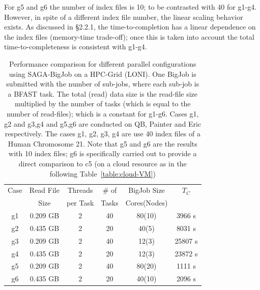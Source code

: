 \documentclass{cpeauth}
\begin{document}
For g5 and g6 the number of index files is 10; to be contrasted with
40 for g1-g4.  However, in spite of a different index file number, the
linear scaling behavior exists.  As discussed in \S 2.2.1, the
time-to-completion has a linear dependence on the index files
(memory-time trade-off); once this is taken into account the total
time-to-completeness is consistent with g1-g4.


 \begin{table}
 \small
 \begin{tabular}{|c|c|c|c|c|c|} 
 \hline 
Case & Read File & Threads   &  \# of & BigJob Size   &   $T_C$   \\
   & Size& per Task & Tasks  & Cores(Nodes)  & \\
   \hline
g1 & 0.209 GB & 2 &   40 &  80(10) & 3966 s \\
g2 & 0.435 GB & 2 &  20 & 40(5) & 8031 s\\ \hline
g3  & 0.209 GB& 2 & 40  & 12(3) & 25807 s \\
g4 & 0.435 GB& 2 & 20  & 12(3) & 23872 s  \\ \hline
\hline
g5 & 0.209 GB& 2& 40 & 80(20) & 1111 s \\
g6&0.435 GB&2& 20 & 40(10)&2096 s\\
\hline
\end{tabular}
\caption{Performance comparison for different parallel configurations
  using SAGA-BigJob on a HPC-Grid (LONI). One BigJob is submitted with
  the number of sub-jobs, where each sub-job is a BFAST task.  The
  total (read) data size is the read-file size multiplied by the
  number of tasks (which is equal to the number of read-files); which
  is a constant for g1-g6.  Cases g1, g2 and g3,g4 and g5,g6 are
  conducted on QB, Painter and Eric respectively. The cases g1, g2,
  g3, g4 are use 40 index files of a Human Chromosome 21.  Note that
  g5 and g6 are the results with 10 index files; g6 is specifically
  carried out to provide a direct comparison to c5 (on a cloud
  resource as in the following Table~\ref{table:cloud-VM}) }
  
  \label{table:bigjob-loni} 
\end{table}

\end{document}
